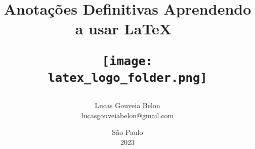 \title{                                 %
\textbf{Anotações Definitivas}          %
\break                                  %
Aprendendo a usar \LaTeX\               %
\vspace{5cm}                            %
\begin{figure}[!htb]                    %
\centering                              %
\texttt{[image: latex\_logo\_folder.png]}%
\end{figure}                            %
\vspace{4.5cm}                            %
}                                       %
\pagestyle{fancy}                       %
\author{                                %
    Lucas Gouveia Belon \\              %
    lucasgouveiabelon@gmail.com         %
}                                       %
\date{\vspace{2.2cm}São Paulo\\2023}    %
\maketitle                              %
\newpage                                %

